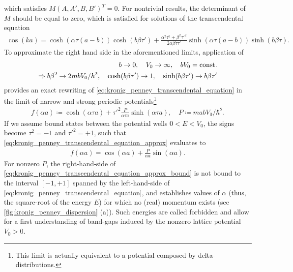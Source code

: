 which satisfies $M(A,A',B,B')^T=0$.
For nontrivial results, the determinant of $M$ should be equal to zero, which is satisfied for solutions of the transcendental equation
\begin{align}
    \cos(ka)
    =
    \cosh(\alpha\tau(a-b))\cosh(b\beta\tau')
    +
    \frac{\alpha^2\tau^2+\beta^2\tau'^2}{2\alpha\beta\tau\tau'}\sinh(\alpha\tau(a-b))\sinh(b\beta\tau).
    \label{eq:kronig_penney_transcendental_equation}
\end{align}
To approximate the right hand side in the aforementioned limits, application of
\begin{align}
    b\rightarrow0,
    \quad
    V_0\rightarrow\infty,
    \quad
    bV_0 = {\rm const.}
    \\
    \Rightarrow
    b\beta^2\rightarrow 2mbV_0/\hbar^2,
    \quad
    \cosh(b\beta\tau')\rightarrow 1,
    \quad
    \sinh(b\beta\tau')\rightarrow b\beta\tau'
\end{align}
provides an exact rewriting of \cref{eq:kronig_penney_transcendental_equation} in the limit of narrow and strong periodic potentials\footnote{This limit is actually equivalent to a potential composed by delta-distributions.}
\begin{align}
    f(\alpha a) \coloneqq \cosh(\alpha\tau a) + \tau'^2\frac{P}{\alpha\tau a}\sinh(\alpha\tau a),
    \quad
    P \coloneqq mabV_0/\hbar^2.
    \label{eq:kronig_penney_transcendental_equation_approx}
\end{align}
If we assume bound states between the potential wells $0<E<V_0$, the signs become $\tau^2=-1$ and $\tau'^2=+1$, such that \cref{eq:kronig_penney_transcendental_equation_approx} evaluates to
\begin{align}
    f(\alpha a) = \cos(\alpha a) + \frac{P}{\alpha a}\sin(\alpha a).
    \label{eq:kronig_penney_transcendental_equation_approx_bound}
\end{align}
For nonzero $P$, the right-hand-side of \cref{eq:kronig_penney_transcendental_equation_approx_bound} is not bound to the interval $[-1,+1]$ spanned by the left-hand-side of \cref{eq:kronig_penney_transcendental_equation}, and establishes values of $\alpha$ (thus, the square-root of the energy $E$) for which no (real) momentum exists (see \cref{fig:kronig_penney_dispersion} (a)).
Such energies are called forbidden and allow for a first understanding of band-gaps induced by the nonzero lattice potential $V_0>0$.
